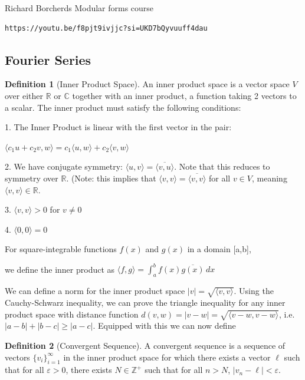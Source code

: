 \documentclass{article}
\theoremstyle{definition}
\newtheorem{definition}{Definition}[section]
\theoremstyle{definition}
\theoremstyle{definition}
\begin{document}
Richard Borcherds Modular forms course
\begin{verbatim}
https://youtu.be/f8pjt9ivjjc?si=UKD7bQyvuuff4dau
\end{verbatim}













\subsection{Fourier Series}
\begin{definition}[Inner Product Space]
    An inner product space is a vector space $V$ over either $\mathbb{R}$ or $\mathbb{C}$ together with an inner product, a function taking 2 vectors to a scalar. The inner product must satisfy the following conditions:


1. The Inner Product is linear with the first vector in the pair: 
    
    $\langle c_1 u + c_2 v, w \rangle = c_1 \langle u, w \rangle + c_2 \langle v, w \rangle$
  

2. We have conjugate symmetry: $\langle u, v \rangle = \overline{\langle v, u \rangle}$.
Note that this reduces to symmetry over $\mathbb{R}$. (Note: this implies that $\langle v,v\rangle=\overline{\langle v,v\rangle}$ for all $v\in V$, meaning $\langle v,v\rangle\in\mathbb{R}$.


3. $\langle v,v \rangle > 0$ for $v\neq 0$

4. $\langle 0,0\rangle=0$

For square-integrable functions $f(x)$ and $g(x)$ in a domain [a,b], 

we define the inner product as
$\langle f, g \rangle = \int_{a}^{b} f(x) \overline{g(x)} \, dx$

\end{definition}

We can define a norm for the inner product space $|v|=\sqrt{\langle v,v\rangle}$. Using the Cauchy-Schwarz inequality, we can prove the triangle inequality for any inner product space with distance function $d(v,w)=|v-w|=\sqrt{\langle v-w, v-w\rangle}$, i.e. $|a-b|+|b-c|\geq|a-c|$. Equipped with this we can now define

\begin{definition}[Convergent Sequence]
    A convergent sequence is a sequence of vectors $\{v_i\}_{i=1}^\infty$ in the inner product space for which there exists a vector $\ell$ such that for all $\varepsilon>0$, there exists $N\in\mathbb{Z}^+$ such that for all $n>N$, $|v_n-\ell|<\varepsilon$. 
\end{definition}
\end{document}
